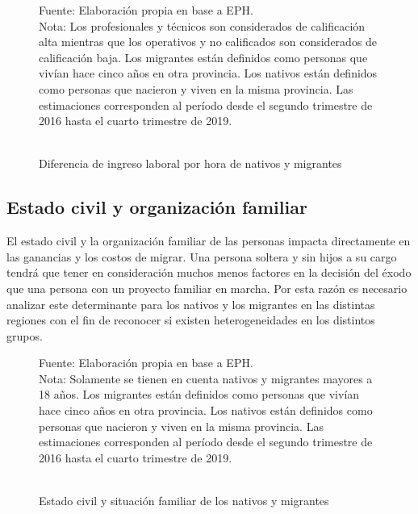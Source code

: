 \documentclass[12pt,a4paper]{article}
\begin{document}
\begin{figure}[!htbp]
\begin{center}
\caption{\\Diferencia de ingreso laboral por hora de nativos y migrantes}
\label{figure:prima_sal}
 

  
\end{center}
\begin{flushleft}
\begin{scriptsize}
Fuente: Elaboración propia en base a EPH.\\
Nota: Los profesionales y técnicos son considerados de calificación alta mientras que los operativos y no calificados son considerados de calificación baja. Los migrantes están definidos como personas que vivían hace cinco años en otra provincia. Los nativos están definidos como personas que nacieron y viven en la misma provincia. Las estimaciones corresponden al período desde el segundo trimestre de 2016 hasta el cuarto trimestre de 2019.
\end{scriptsize}
\end{flushleft}
\end{figure}

\newpage
\subsection{Estado civil y organización familiar}

El estado civil y la organización familiar de las personas impacta directamente en las ganancias y los costos de migrar. Una persona soltera y sin hijos a su cargo tendrá que tener en consideración muchos menos factores en la decisión del éxodo que una persona con un proyecto familiar en marcha. Por esta razón es necesario analizar este determinante para los nativos y los migrantes en las distintas regiones con el fin de reconocer si existen heterogeneidades en los distintos grupos.

\begin{figure}[htbp!]
\begin{center}
\caption{\\Estado civil y situación familiar de los nativos y migrantes}
\label{figure:estadociv_mig}
 
\end{center}
\begin{flushleft}
\begin{scriptsize}
Fuente: Elaboración propia en base a EPH.\\
Nota: Solamente se tienen en cuenta nativos y migrantes mayores a 18 años. Los migrantes están definidos como personas que vivían hace cinco años en otra provincia. Los nativos están definidos como personas que nacieron y viven en la misma provincia. Las estimaciones corresponden al período desde el segundo trimestre de 2016 hasta el cuarto trimestre de 2019.
\end{scriptsize}
\end{flushleft}
\end{figure}
\end{document}
